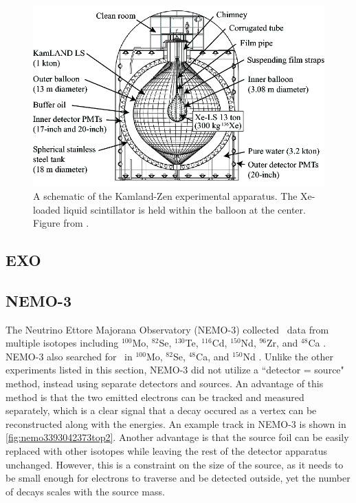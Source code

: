 \begin{figure}[tbph]
\centering
\includegraphics[width=0.7\linewidth]{Figures/KamlandZen}
\caption{A schematic of the Kamland-Zen experimental apparatus. The Xe-loaded liquid scintillator is held within the balloon at the center. Figure from \cite{::2015uaa}.}
\label{fig:kamlandzen}
\end{figure}

\subsection{EXO}

\subsection{NEMO-3}
The Neutrino Ettore Majorana Observatory (NEMO-3) collected \twonubb~data from multiple isotopes including $^{100}$Mo, $^{82}$Se, $^{130}$Te, $^{116}$Cd, $^{150}$Nd, $^{96}$Zr, and $^{48}$Ca \cite{Bongrand:2011ei}. NEMO-3 also searched for \zeronubb~in $^{100}$Mo, $^{82}$Se, $^{48}$Ca, and $^{150}$Nd \cite{Bongrand:2011ei}\cite{::2016dpe}\cite{Arnold:2016ezh}. Unlike the other experiments listed in this section, NEMO-3 did not utilize a ``detector = source" method, instead using separate detectors and sources. An advantage of this method is that the two emitted electrons can be tracked and measured separately, which is a clear signal that a decay occured as a vertex can be reconstructed along with the energies. An example track in NEMO-3 is shown in \autoref{fig:nemo3393042373top2}. Another advantage is that the source foil can be easily replaced with other isotopes while leaving the rest of the detector apparatus unchanged. However, this is a constraint on the size of the source, as it needs to be small enough for electrons to traverse and be detected outside, yet the number of decays scales with the source mass.

